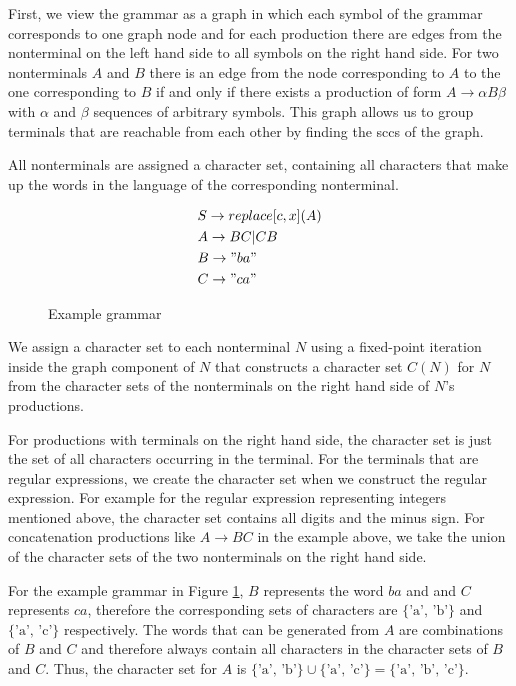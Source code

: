 First, we view the grammar as a graph in which each symbol of the grammar corresponds to one graph node and for each production there are edges from the nonterminal on the left hand side to all symbols on the right hand side. 
For two nonterminals $A$ and $B$ there is an edge from the node corresponding to $A$ to the one corresponding to $B$ if and only if there exists a production of form $A \rightarrow \alpha B \beta$ with $\alpha$ and $\beta$ sequences of arbitrary symbols.
This graph allows us to group terminals that are reachable from each other by finding the \acp{scc} of the graph.

All nonterminals are assigned a character set, containing all characters that make up the words in the language of the corresponding nonterminal.

\begin{figure}[!h]
	\begin{align*}
		&S \rightarrow replace[c, x](A)\\
		&A \rightarrow BC | CB\\
		&B \rightarrow "ba"\\
		&C \rightarrow "ca"
	\end{align*}
	\caption{Example grammar}
	\label{fig:charset:grammar}
\end{figure}

We assign a character set to each nonterminal $N$ using a fixed-point iteration inside the graph component of $N$ that constructs a character set $C(N)$ for $N$ from the character sets of the nonterminals on the right hand side of $N$'s productions.

For productions with terminals on the right hand side, the character set is just the set of all characters occurring in the terminal. For the terminals that are regular expressions, we create the character set when we construct the regular expression. For example for the regular expression representing integers mentioned above, the character set contains all digits and the minus sign.
For concatenation productions like $A \rightarrow BC$ in the example above, we take the union of the character sets of the two nonterminals on the right hand side.

For the example grammar in Figure \ref{fig:charset:grammar}, $B$ represents the word $ba$ and and $C$ represents $ca$, therefore the corresponding sets of characters are  $\{\text{'a', 'b'}\}$ and  $\{\text{'a', 'c'}\}$ respectively. The words that can be generated from $A$ are combinations of $B$ and $C$ and therefore always contain all characters in the character sets of $B$ and $C$. Thus, the character set for $A$ is $\{\text{'a', 'b'}\} \cup \{\text{'a', 'c'}\} = \{\text{'a', 'b', 'c'}\}$.


